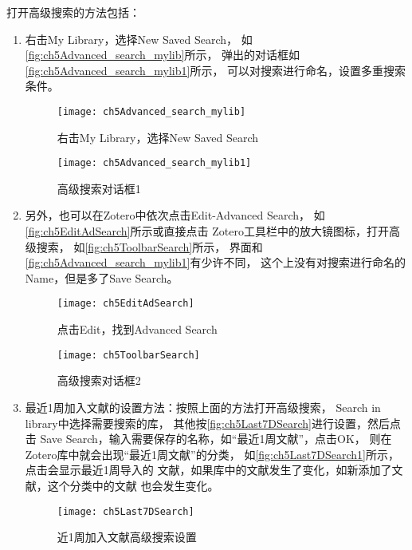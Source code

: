 \documentclass[cn,11pt,chinese]{elegantbook}
\begin{document}
		打开高级搜索的方法包括：
				\begin{enumerate}
					\item 右击My Library，选择New Saved Search，
					如\autoref{fig:ch5Advanced_search_mylib}所示，
					弹出的对话框如\autoref{fig:ch5Advanced_search_mylib1}所示，
					可以对搜索进行命名，设置多重搜索条件。
						\begin{figure}[ht]
							\centering
							\texttt{[image: ch5Advanced\_search\_mylib]}
							\caption{右击My Library，选择New Saved Search}
							\label{fig:ch5Advanced_search_mylib}
						\end{figure}
						
						\begin{figure}[ht]
							\centering
							\texttt{[image: ch5Advanced\_search\_mylib1]}
							\caption{高级搜索对话框1}
							\label{fig:ch5Advanced_search_mylib1}
						\end{figure}
					\item 另外，也可以在Zotero中依次点击Edit-Advanced Search，
					如\autoref{fig:ch5EditAdSearch}所示或直接点击
					Zotero工具栏中的放大镜图标，打开高级搜索，
					如\autoref{fig:ch5ToolbarSearch}所示，
					界面和\autoref{fig:ch5Advanced_search_mylib1}有少许不同，
					这个上没有对搜索进行命名的Name，但是多了Save Search。
						\begin{figure}[ht]
							\centering
							\texttt{[image: ch5EditAdSearch]}
							\caption{点击Edit，找到Advanced Search}
							\label{fig:ch5EditAdSearch}
						\end{figure}
						\begin{figure}[ht]
							\centering
							\texttt{[image: ch5ToolbarSearch]}
							\caption{高级搜索对话框2}
							\label{fig:ch5ToolbarSearch}
						\end{figure}
					\item 最近1周加入文献的设置方法：按照上面的方法打开高级搜索，
					Search in library中选择需要搜索的库，
					其他按\autoref{fig:ch5Last7DSearch}进行设置，然后点击
					Save Search，输入需要保存的名称，如“最近1周文献”，点击OK，
					则在Zotero库中就会出现“最近1周文献”的分类，
					如\autoref{fig:ch5Last7DSearch1}所示，点击会显示最近1周导入的
					文献，如果库中的文献发生了变化，如新添加了文献，这个分类中的文献
					也会发生变化。
						\begin{figure}[ht]
							\centering
							\texttt{[image: ch5Last7DSearch]}
							\caption{近1周加入文献高级搜索设置}
							\label{fig:ch5Last7DSearch}
						\end{figure}	


\end{enumerate}
\end{document}
